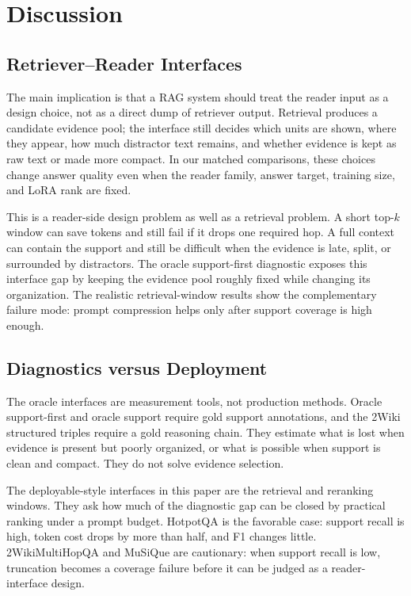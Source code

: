 \documentclass[a4paper,fleqn]{cas-sc}
\begin{document}
\section{Discussion}

\subsection{Retriever--Reader Interfaces}

The main implication is that a RAG system should treat the reader input as a
design choice, not as a direct dump of retriever output. Retrieval produces a
candidate evidence pool; the interface still decides which units are shown,
where they appear, how much distractor text remains, and whether evidence is
kept as raw text or made more compact. In our matched comparisons, these
choices change answer quality even when the reader family, answer target,
training size, and LoRA rank are fixed.

This is a reader-side design problem as well as a retrieval problem. A short
top-$k$ window can save tokens and still fail if it drops one required hop. A
full context can contain the support and still be difficult when the evidence
is late, split, or surrounded by distractors. The oracle support-first
diagnostic exposes this interface gap by keeping the evidence pool roughly
fixed while changing its organization. The realistic retrieval-window results
show the complementary failure mode: prompt compression helps only after
support coverage is high enough.

\subsection{Diagnostics versus Deployment}

The oracle interfaces are measurement tools, not production methods. Oracle
support-first and oracle support require gold support annotations, and the
2Wiki structured triples require a gold reasoning chain. They estimate what is
lost when evidence is present but poorly organized, or what is possible when
support is clean and compact. They do not solve evidence selection.

The deployable-style interfaces in this paper are the retrieval and reranking
windows. They ask how much of the diagnostic gap can be closed by practical
ranking under a prompt budget. HotpotQA is the favorable case: support recall
is high, token cost drops by more than half, and F1 changes little.
2WikiMultiHopQA and MuSiQue are cautionary: when support recall is low,
truncation becomes a coverage failure before it can be judged as a
reader-interface design.
\end{document}
